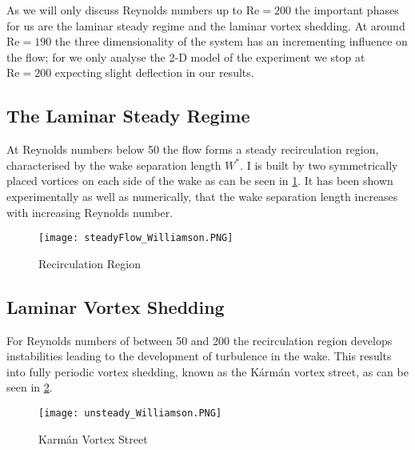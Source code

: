 	As we will only discuss Reynolds numbers up to $\text{Re} = 200$ the important phases for us are the laminar steady regime and the laminar vortex shedding. At around $\text{Re} = 190$ the three dimensionality of the system has an incrementing influence on the flow; for we only analyse the 2-D model of the experiment we stop at $\text{Re} = 200$ expecting slight deflection in our results.
	
	\subsection{The Laminar Steady Regime}
	
	At Reynolds numbers below 50 the flow forms a steady recirculation region, characterised by the wake separation length  $W^*$. I is built by two symmetrically placed vortices on each side of the wake as can be seen in \ref{fig:steady}. It has been shown experimentally as well as numerically, that the wake separation length increases with increasing Reynolds number. 
		\begin{figure}[htp]
			\centering
			\texttt{[image: steadyFlow\_Williamson.PNG]}
			\caption{Recirculation Region \cite{williamson1996vortex}}
			\label{fig:steady}
		\end{figure}
	\subsection{Laminar Vortex Shedding}
	For Reynolds numbers of between 50 and 200 the recirculation region develops instabilities leading to the development of turbulence in the wake. This results into fully periodic vortex shedding, known as the Kármán vortex street, as can be seen in \ref{fig:unsteady}.
	
		\begin{figure}[htp]
			\centering
			\texttt{[image: unsteady\_Williamson.PNG]}
			\caption{Karmán Vortex Street \cite{williamson1996vortex}}
			\label{fig:unsteady}
		\end{figure}
		
